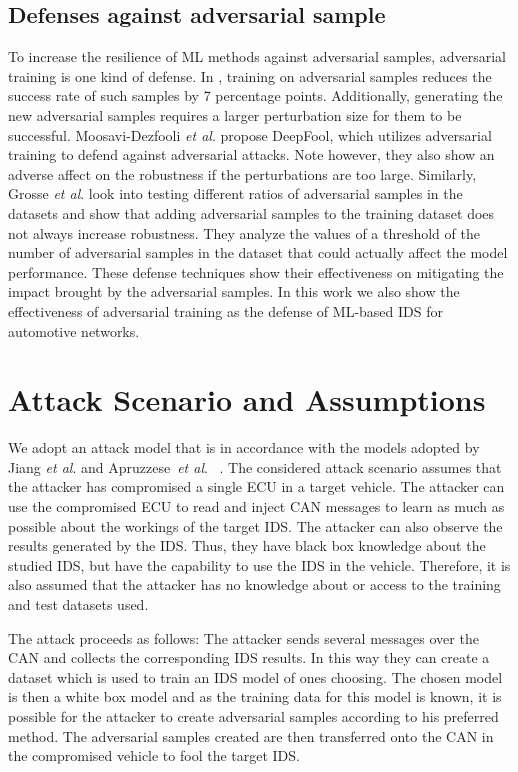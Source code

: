 \documentclass[conference]{IEEEtran}
\newcommand{\etal}{\textit{et al}. }
\begin{document}
\subsection{Defenses against adversarial sample}

To increase the resilience of ML methods against adversarial samples, adversarial training is one kind of defense. In \cite{Limitations_Deep_Learning_Adversarial_Setting_2016}, training on adversarial samples reduces the success rate of such samples by 7 percentage points. Additionally, generating the new adversarial samples requires a larger perturbation size for them to be successful. Moosavi-Dezfooli \etal \cite{Deepfool_2016} propose DeepFool, which utilizes adversarial training to defend against adversarial attacks. Note however, they also show an adverse affect on the robustness if the perturbations are too large. Similarly, Grosse \etal \cite{Adversarial_Perturbations_Against_Deep_Neural_Networks_Malware_Classification_2016} look into testing different ratios of adversarial samples in the datasets and show that adding adversarial samples to the training dataset does not always increase robustness. They analyze the values of a threshold of the number of adversarial samples in the dataset that could actually affect the model performance. These defense techniques show their effectiveness on mitigating the impact brought by the adversarial samples. In this work we also  show the effectiveness of adversarial training as the defense of ML-based IDS for automotive networks.

\section{Attack Scenario and Assumptions}
\label{sec:problemmodel}
We adopt an attack model that is in accordance with the models adopted by Jiang \etal \cite{Poisoning_Evasion_DL_Vehicles} and Apruzzese~\etal~\cite{Modeling_Realistic_Attacks_NIDS}.
%
The considered attack scenario assumes that the attacker has compromised a single ECU in a target vehicle. The attacker can use the compromised ECU to read and inject CAN messages to learn as much as possible about the workings of the target IDS. The attacker can also observe the results generated by the IDS. Thus, they have black box knowledge about the studied IDS, but have the capability to use the IDS in the vehicle.
%
Therefore, it is also assumed that the attacker has no knowledge about or access to the training and test datasets used.

The attack proceeds as follows: The attacker sends several messages over the CAN and collects the corresponding IDS results. In this way they can create a dataset which is used to train an IDS model of ones choosing. The chosen model is then a white box model and as the training data for this model is known, it is possible for the attacker to create adversarial samples according to his preferred method. The adversarial samples created are then transferred onto the CAN in the compromised vehicle to fool the target IDS.
\end{document}
